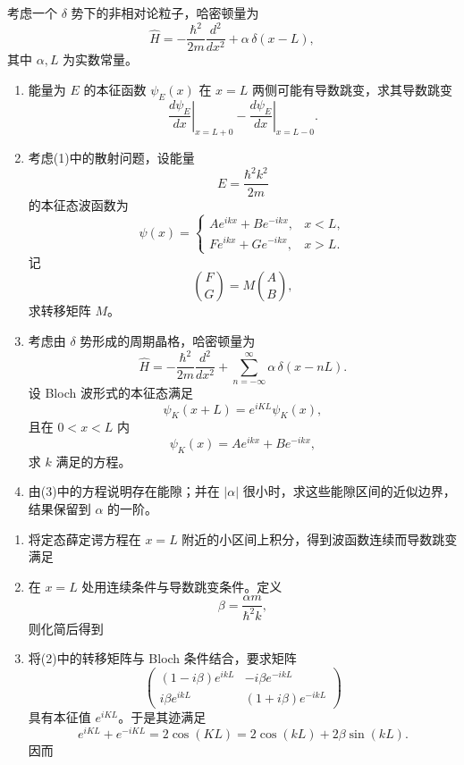 \begin{question}
考虑一个 $\delta$ 势下的非相对论粒子，哈密顿量为
\[
\hat H=-\frac{\hbar^2}{2m}\frac{d^2}{dx^2}+\alpha\,\delta(x-L),
\]
其中 $\alpha,L$ 为实数常量。

\begin{enumerate}[label=(\arabic*),leftmargin=2.5em]
  \item 能量为 $E$ 的本征函数 $\psi_E(x)$ 在 $x=L$ 两侧可能有导数跳变，求其导数跳变
  \[
  \left.\frac{d\psi_E}{dx}\right|_{x=L+0}-\left.\frac{d\psi_E}{dx}\right|_{x=L-0}.
  \]
  \item 考虑(1)中的散射问题，设能量
  \[
  E=\frac{\hbar^2 k^2}{2m}
  \]
  的本征态波函数为
  \[
  \psi(x)=
  \begin{cases}
  Ae^{ikx}+Be^{-ikx}, & x<L,\\
  Fe^{ikx}+Ge^{-ikx}, & x>L.
  \end{cases}
  \]
  记
  \[
  \binom{F}{G}=M\binom{A}{B},
  \]
  求转移矩阵 $M$。
  \item 考虑由 $\delta$ 势形成的周期晶格，哈密顿量为
  \[
  \hat H=-\frac{\hbar^2}{2m}\frac{d^2}{dx^2}+\sum_{n=-\infty}^{\infty}\alpha\,\delta(x-nL).
  \]
  设 Bloch 波形式的本征态满足
  \[
  \psi_K(x+L)=e^{iKL}\psi_K(x),
  \]
  且在 $0<x<L$ 内
  \[
  \psi_K(x)=Ae^{ikx}+Be^{-ikx},
  \]
  求 $k$ 满足的方程。
  \item 由(3)中的方程说明存在能隙；并在 $|\alpha|$ 很小时，求这些能隙区间的近似边界，结果保留到 $\alpha$ 的一阶。
\end{enumerate}

\begin{solution}
\begin{enumerate}[label=(\arabic*),leftmargin=2.5em]
  \item 将定态薛定谔方程在 $x=L$ 附近的小区间上积分，得到波函数连续而导数跳变满足

  \item 在 $x=L$ 处用连续条件与导数跳变条件。定义
  \[
  \beta=\frac{\alpha m}{\hbar^2 k},
  \]
  则化简后得到

  \item 将(2)中的转移矩阵与 Bloch 条件结合，要求矩阵
  \[
  \begin{pmatrix}
  (1-i\beta)e^{ikL} & -i\beta e^{-ikL}\\
  i\beta e^{ikL} & (1+i\beta)e^{-ikL}
  \end{pmatrix}
  \]
  具有本征值 $e^{iKL}$。于是其迹满足
  \[
  e^{iKL}+e^{-iKL}=2\cos(KL)=2\cos(kL)+2\beta\sin(kL).
  \]
  因而


\end{enumerate}
\end{solution}
\end{question}
